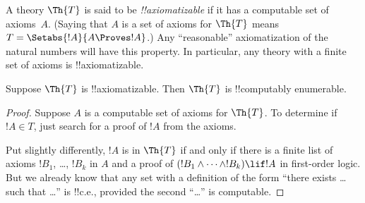 \documentclass[../../../include/open-logic-section]{subfiles}
\begin{document}


A theory $\Th{T}$ is said to be \emph{!!{axiomatizable}} if it has a
computable set of axioms~$A$. (Saying that $A$ is a set of axioms for
$\Th{T}$ means $T = \Setabs{!A}{A \Proves !A}$.) Any ``reasonable''
axiomatization of the natural numbers will have this property. In
particular, any theory with a finite set of axioms is
!!{axiomatizable}.

\begin{lem}
Suppose $\Th{T}$ is !!{axiomatizable}. Then $\Th{T}$ is !!{computably
enumerable}.
\end{lem}

\begin{proof}
Suppose $A$ is a computable set of axioms for $\Th{T}$. To determine
if $!A \in T$, just search for a proof of $!A$ from the axioms.

Put slightly differently, $!A$ is in $\Th{T}$ if and only if there is
a finite list of axioms $!B_1$, \dots, $!B_k$ in $A$ and a proof of
$(!B_1 \land \dots \land !B_k) \lif !A$ in first-order logic.  But
we already know that any set with a definition of the form ``there
exists \dots such that \dots'' is !!{c.e.}, provided the second ``\dots''
is computable.
\end{proof}
\end{document}
